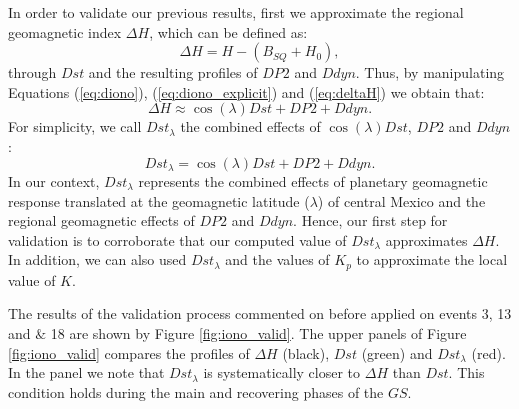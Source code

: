 \documentclass[a4paper,fleqn]{cas-dc}
\begin{document}
In order to validate our previous results, first we approximate the regional geomagnetic index $\Delta H$, which can be defined as:
\begin{equation}
    \label{eq:deltaH}
    \Delta H = H - (B_{SQ} + H_0),
\end{equation}
through $Dst$ and the resulting profiles of $DP2$ and $Ddyn$. Thus, by manipulating Equations (\ref{eq:diono}), (\ref{eq:diono_explicit}) and (\ref{eq:deltaH}) we obtain that:
\begin{equation}
    \label{eq:deltaHandDst}
    \Delta H \approx \cos(\lambda) Dst + DP2 + Ddyn.
\end{equation}
For simplicity, we call $ Dst_\lambda$ the combined effects of $ \cos(\lambda) Dst$, $DP2$ and $Ddyn$:
\begin{equation}
    \label{eq:Dstlambda}
    Dst_\lambda = \cos(\lambda) Dst + DP2 + Ddyn.
\end{equation}
In our context, $Dst_\lambda$ represents the combined effects of planetary geomagnetic response translated at the geomagnetic latitude ($\lambda$) of central Mexico and the regional geomagnetic effects of $DP2$ and $Ddyn$. Hence, our first step for validation is to corroborate that our computed value of $ Dst_\lambda$ approximates $\Delta H$. In addition, we can also used $ Dst_\lambda$ and the values of $K_p$ to approximate the local value of $K$.

The results of the validation process commented on before applied on events 3, 13 and $\&$ 18 are shown by Figure \ref{fig:iono_valid}. The upper panels of Figure \ref{fig:iono_valid} compares the profiles of $\Delta H$ (black), $Dst$ (green) and $Dst_\lambda$ (red). In the panel we note that $Dst_\lambda$ is systematically closer to $\Delta H$ than $Dst$. This condition holds during the main and recovering phases of the $GS$. %


\end{document}
